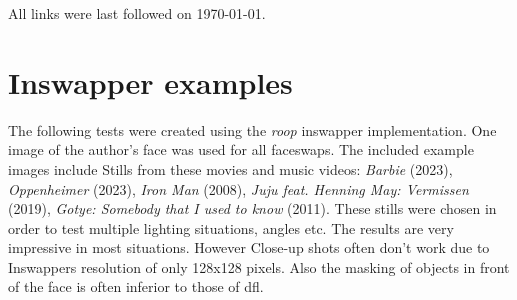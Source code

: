 \documentclass[
  a4paper,  %
  twoside,  %
  bibliography=totoc,
  headsepline,
  cleardoublepage=empty,
  parskip=half,
  draft=false
]{scrbook}
\begin{document}

\printbibliography
All links were last followed on \today{}.

\appendix
\chapter{Inswapper examples}
\label{chap:insightface-demos}
The following tests were created using the \textit{roop} inswapper implementation. One image of the author's face was used for all faceswaps. The included example images include Stills from these movies and music videos: \textit{Barbie} (2023), \textit{Oppenheimer} (2023), \textit{Iron Man} (2008), \textit{Juju feat. Henning May: Vermissen} (2019), \textit{Gotye: Somebody that I used to know} (2011).
These stills were chosen in order to test multiple lighting situations, angles etc. The results are very impressive in most situations. However Close-up shots often don't work due to Inswappers resolution of only 128x128 pixels. Also the masking of objects in front of the face is often inferior to those of \gls{dfl}.
\end{document}
